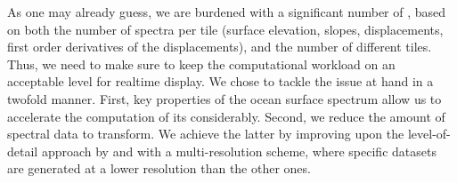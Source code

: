 As one may already guess, we are burdened with a significant number of
\FourierTransforms, based on both the number of spectra per tile (surface elevation,
slopes, displacements, first order derivatives of the displacements),
and the number of different tiles.
Thus, we need to make sure to keep the computational workload on an acceptable
level for realtime display. We chose to tackle the issue at hand in a
twofold manner.
First, key properties of the ocean surface spectrum allow us to accelerate the
computation of its \InvFourierTransform considerably.
Second, we reduce the amount of spectral data to transform. We achieve the
latter by improving upon the level-of-detail approach by \citet{misc:oceanlightingfft}
and \citet{article:whitecaps} with a multi-resolution scheme, where specific
datasets are generated at a lower resolution than the other ones.




